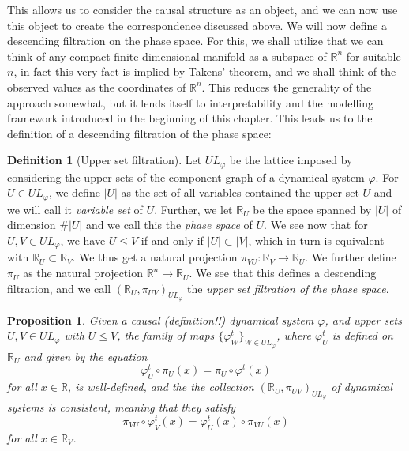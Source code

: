 \documentclass[11pt, a4paper]{memoir}
\theoremstyle{plain}
\newtheorem{prop}{Proposition}
\theoremstyle{definition}
\newtheorem{defn}{Definition}
\newcommand{\mR}{\mathbb{R}}
\begin{document}
This allows us to consider the causal structure as an object, and we can now use this object to create the correspondence discussed above. We will now define a descending filtration on the phase space. For this, we shall utilize that we can think of any compact finite dimensional manifold as a subspace of $\mR^n$ for suitable $n$, in fact this very fact is implied by Takens' theorem, and we shall think of the observed values as the coordinates of $\mR^n$. This reduces the generality of the approach somewhat, but it lends itself to interpretability and the modelling framework introduced in the beginning of this chapter. This leads us to the definition of a descending filtration of the phase space:
\begin{defn}[Upper set filtration]
Let $UL_\varphi$ be the lattice imposed by considering the upper sets of the component graph of a dynamical system $\varphi$. For $U\in UL_\varphi$, we define $|U|$ as the set of all variables contained the upper set $U$ and we will call it \textit{variable set} of $U$. Further, we let $\mR_U$ be the space spanned by $|U|$ of dimension $\#|U|$ and we call this the \textit{phase space} of $U$. We see now that for $U,V\in UL_\varphi$, we have $U\leq V$ if and only if $|U|\subset |V|$, which in turn is equivalent with $\mR_U\subset \mR_V$. We thus get a natural projection $\pi_{VU}:\mR_V\to\mR_U$. We further define $\pi_U$ as the natural projection $\mR^n\to \mR_U$. We see that this defines a descending filtration, and we call $(\mR_U,\pi_{UV})_{UL_\varphi}$ the \emph{upper set filtration of the phase space}.
\end{defn} 
\begin{prop}
Given a causal (\textit{definition!!}) dynamical system $\varphi$, and upper sets $U,V\in UL_\varphi$ with $U\leq V$, the family of maps $\{\varphi^t_W\}_{W\in UL_\varphi}$, where $\varphi_U^t$ is defined on $\mR_U$ and given by the equation
$$\varphi^t_U\circ\pi_U(x)=\pi_U\circ \varphi^t(x)$$
for all $x\in \mR$, is well-defined, and the the collection $(\mR_U,\pi_{UV})_{UL_\varphi}$ of dynamical systems is consistent, meaning that they satisfy
$$\pi_{VU}\circ \varphi_V^t(x)=\varphi_U^t(x)\circ\pi_{VU}(x)$$
for all $x\in \mR_V$.
\end{prop}
\end{document}
